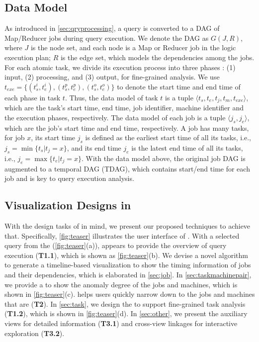 \subsection{Data Model}\label{sec:data}
As introduced in \autoref{sec:qryprocessing}, a query is converted to a DAG of Map/Reducer jobs during query execution. We denote the DAG as $G(J,R)$, where $J$ is the node set, and each node is a Map or Reducer job in the logic execution plan; $R$ is the edge set, which models the dependencies among the jobs.
For each atomic task, we divide its execution process into three phases 
: (1) input, (2) processing, and (3) output, for fine-grained analysis. 
We use $t_{exe}=\{(t_s^i, t_e^i), (t_s^p,  t_e^p), (t_s^o, t_e^o) \}$ to denote the start time and end time of each phase in task $t$.
Thus, the data model of task $t$ is a tuple $\langle t_s, t_e, t_j, t_m, t_{exe} \rangle$, which are the task's start time, end time, job identifier, machine identifier and the execution phases, respectively. The data model of each job is a tuple $\langle j_s, j_e \rangle$, which are the job's start time and end time, respectively.
A job has many tasks, for job $x$, its start time $j_s$ is defined as the earliest start time of all its tasks, i.e., $j_s = \min \{ t_s | t_j = x \}$, and its end time $j_e$ is the latest end time of all its tasks, i.e., $j_e = \max \{ t_e | t_j = x \}$.
With the data model above, the original job DAG is augmented to a temporal DAG (TDAG), which contains start/end time for each job and is key to query execution analysis.





\subsection{Visualization Designs in \qevis{}}\label{sec:design}


With the design tasks of \qevis{} in mind, we present our proposed techniques to achieve that.
Specifically, \autoref{fig:teaser} illustrates the user interface of \qevis{}.
With a selected query from the  (\autoref{fig:teaser}(a)),  appears to provide the overview of query execution (\textbf{T1.1}), which is shown as \autoref{fig:teaser}(b). We devise a novel algorithm to generate a timeline-based visualization to show the timing information of jobs and their dependencies, which is elaborated in \autoref{sec:job}.
In \autoref{sec:taskmachinepair}, we provide a  to show the anomaly degree of the jobs and machines, which is shown in \autoref{fig:teaser}(c).  helps users quickly narrow down to the jobs and machines that are  (\textbf{T2}). 
In \autoref{sec:task}, we design the  to support fine-grained task analysis (\textbf{T1.2}), which is shown in \autoref{fig:teaser}(d).
In \autoref{sec:other}, we present the auxiliary views for detailed information (\textbf{T3.1}) and cross-view linkages for interactive exploration (\textbf{T3.2}).

